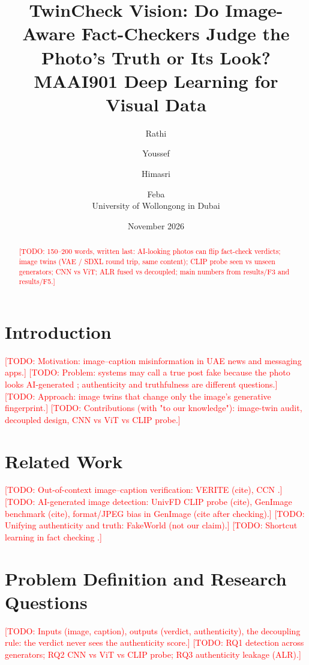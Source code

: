 \documentclass[11pt,a4paper]{article}
\title{TwinCheck Vision: Do Image-Aware Fact-Checkers Judge the Photo's Truth or Its Look?\\
\large MAAI901 Deep Learning for Visual Data}
\author{Rathi \and Youssef \and Himasri \and Feba\\
University of Wollongong in Dubai}
\date{November 2026}
\newcommand{\todo}[1]{\textcolor{red}{[TODO: #1]}}
\begin{document}
\maketitle

\begin{abstract}
\todo{150--200 words, written last: AI-looking photos can flip fact-check verdicts;
image twins (VAE / SDXL round trip, same content); CLIP probe seen vs unseen generators;
CNN vs ViT; ALR fused vs decoupled; main numbers from results/F3 and results/F5.}
\end{abstract}

\section{Introduction}
\label{sec:intro}
\todo{Motivation: image--caption misinformation in UAE news and messaging apps.}
\todo{Problem: systems may call a true post fake because the photo looks AI-generated
\citep{falsdo2026}; authenticity and truthfulness are different questions.}
\todo{Approach: image twins that change only the image's generative fingerprint.}
\todo{Contributions (with "to our knowledge"): image-twin audit, decoupled design, CNN vs ViT vs CLIP probe.}

\section{Related Work}
\label{sec:related}
\todo{Out-of-context image--caption verification: VERITE (cite), CCN \citep{abdelnabi2022ccn}.}
\todo{AI-generated image detection: UnivFD CLIP probe (cite), GenImage benchmark (cite),
format/JPEG bias in GenImage (cite after checking).}
\todo{Unifying authenticity and truth: FakeWorld \citep{fakeworld2026} (not our claim).}
\todo{Shortcut learning in fact checking \citep{papadopoulos2025similarity}.}

\section{Problem Definition and Research Questions}
\label{sec:problem}
\todo{Inputs (image, caption), outputs (verdict, authenticity), the decoupling rule:
the verdict never sees the authenticity score.}
\todo{RQ1 detection across generators; RQ2 CNN vs ViT vs CLIP probe; RQ3 authenticity leakage (ALR).}
\end{document}
